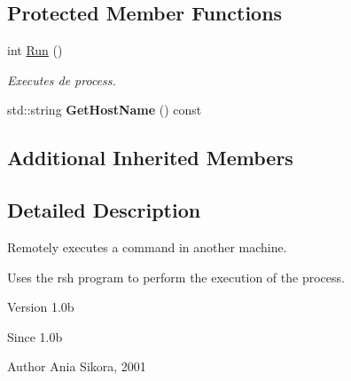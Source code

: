 \subsection*{Protected Member Functions}
\begin{DoxyCompactItemize}
\item 
\hypertarget{class_common_1_1_remote_process_a8cdc86c2191a88ef97a2a743b484fac5}{int \hyperlink{class_common_1_1_remote_process_a8cdc86c2191a88ef97a2a743b484fac5}{Run} ()}\label{class_common_1_1_remote_process_a8cdc86c2191a88ef97a2a743b484fac5}

\begin{DoxyCompactList}\small\item\em Executes de process. \end{DoxyCompactList}\item 
\hypertarget{class_common_1_1_remote_process_a8542d9bcd4bb05453c046c1497748b18}{std\-::string {\bfseries Get\-Host\-Name} () const }\label{class_common_1_1_remote_process_a8542d9bcd4bb05453c046c1497748b18}

\end{DoxyCompactItemize}
\subsection*{Additional Inherited Members}


\subsection{Detailed Description}
Remotely executes a command in another machine. 

Uses the rsh program to perform the execution of the process.

\begin{DoxyVersion}{Version}
1.\-0b 
\end{DoxyVersion}
\begin{DoxySince}{Since}
1.\-0b 
\end{DoxySince}
\begin{DoxyAuthor}{Author}
Ania Sikora, 2001 
\end{DoxyAuthor}


